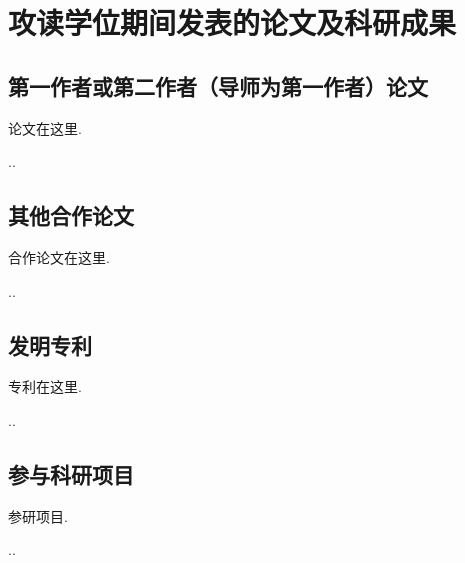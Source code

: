 \chapter*{攻读\cDegree{}学位期间发表的论文及科研成果}

\section*{第一作者或第二作者（导师为第一作者）论文}
\begin{publist}
	\item 论文在这里.
	
	\item ..
	
\end{publist}

\section*{其他合作论文}
\begin{publist}
	\item 合作论文在这里.
	
	\item ..
\end{publist}

\section*{发明专利}
\begin{publist}
	\item 专利在这里.
	
	\item ..
\end{publist}

\section*{参与科研项目}
\begin{publist}
	\item 参研项目.
	
	\item ..
	
\end{publist}